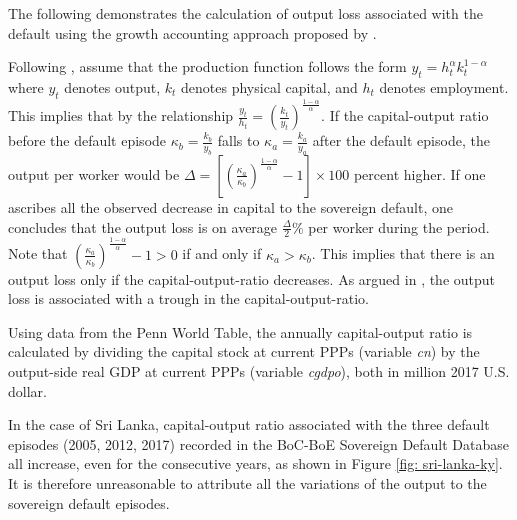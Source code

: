 The following demonstrates the calculation of output loss associated with the default using the growth accounting approach proposed by \citet{zarazaga-12}.

Following \citet{zarazaga-12}, assume that the production function follows the form $y_t = h^\alpha_t k^{1-\alpha}_t$ where $y_t$ denotes output, $k_t$ denotes physical capital, and $h_t$ denotes employment.
This implies that by the relationship $\frac{y_t}{h_t} = \left( \frac{k_t}{y_t} \right)^{\frac{1-\alpha}{\alpha}}$. If the capital-output ratio before the default episode $\kappa_b =\frac{k_b}{y_b}$ falls to $\kappa_a = \frac{k_{a}}{y_a}$ after the default episode, the output per worker would be
$\Delta = \left[\left(\frac{\kappa_a}{\kappa_b} \right)^{\frac{1-\alpha}{\alpha}} -1\right]\times 100$ percent higher.
If one ascribes all the observed decrease in capital to the sovereign default, one concludes that the output loss is on average $\frac{\Delta}{2} \%$ per worker during the period.
Note that $\left(\frac{\kappa_a}{\kappa_b} \right)^{\frac{1-\alpha}{\alpha}} -1 > 0$ if and only if $\kappa_a > \kappa_b$. This implies that there is an output loss only if the capital-output-ratio decreases. As argued in \citet{zarazaga-12}, the output loss is associated with a trough in the capital-output-ratio.

Using data from the Penn World Table, the annually capital-output ratio is calculated by dividing the capital stock at current PPPs (variable \emph{cn}) by the output-side real GDP at current PPPs (variable \emph{cgdpo}), both in million 2017 U.S. dollar.

In the case of Sri Lanka, capital-output ratio associated with the three default episodes (2005, 2012, 2017) recorded in the BoC-BoE Sovereign Default Database all increase, even for the consecutive years, as shown in Figure \ref{fig: sri-lanka-ky}. It is therefore unreasonable to attribute all the variations of the output to the sovereign default episodes.

